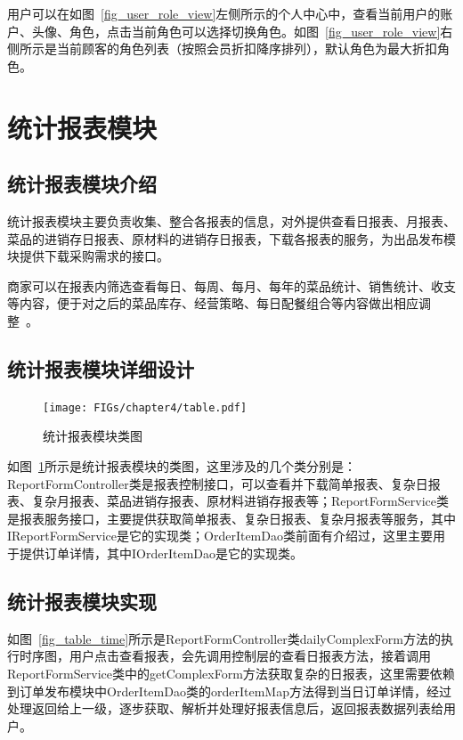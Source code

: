 用户可以在如图~\ref{fig_user_role_view}左侧所示的个人中心中，查看当前用户的账户、头像、角色，点击当前角色可以选择切换角色。如图~\ref{fig_user_role_view}右侧所示是当前顾客的角色列表（按照会员折扣降序排列），默认角色为最大折扣角色。\\

\section{统计报表模块}
\subsection{统计报表模块介绍}
统计报表模块主要负责收集、整合各报表的信息，对外提供查看日报表、月报表、菜品的进销存日报表、原材料的进销存日报表，下载各报表的服务，为出品发布模块提供下载采购需求的接口。

商家可以在报表内筛选查看每日、每周、每月、每年的菜品统计、销售统计、收支等内容，便于对之后的菜品库存、经营策略、每日配餐组合等内容做出相应调整~\cite{dwh2019}。\\

\subsection{统计报表模块详细设计}

\begin{figure}[htbp!]
    \centering
    \texttt{[image: FIGs/chapter4/table.pdf]}
    \caption{统计报表模块类图}\label{fig_table}
\end{figure}

如图~\ref{fig_table}所示是统计报表模块的类图，这里涉及的几个类分别是：ReportFormController类是报表控制接口，可以查看并下载简单报表、复杂日报表、复杂月报表、菜品进销存报表、原材料进销存报表等；ReportFormService类是报表服务接口，主要提供获取简单报表、复杂日报表、复杂月报表等服务，其中IReportFormService是它的实现类；OrderItemDao类前面有介绍过，这里主要用于提供订单详情，其中IOrderItemDao是它的实现类。\\

\subsection{统计报表模块实现}

如图~\ref{fig_table_time}所示是ReportFormController类dailyComplexForm方法的执行时序图，用户点击查看报表，会先调用控制层的查看日报表方法，接着调用ReportFormService类中的getComplexForm方法获取复杂的日报表，这里需要依赖到订单发布模块中OrderItemDao类的orderItemMap方法得到当日订单详情，经过处理返回给上一级，逐步获取、解析并处理好报表信息后，返回报表数据列表给用户。


